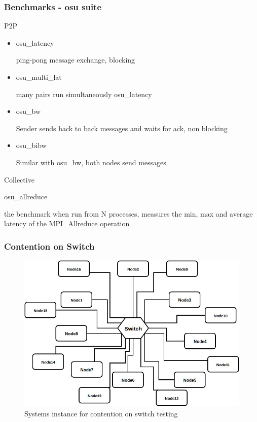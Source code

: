 \documentclass{beamer}
\begin{document}
\begin{frame}
\frametitle{Benchmarks - osu suite}
\begin{block}{P2P}
\begin{itemize}
\item \begin{alertenv}osu\_latency\end{alertenv} {\fontsize{8}{6}\selectfont ping-pong message exchange, blocking}
\item \begin{alertenv}osu\_multi\_lat \end{alertenv}{\fontsize{8}{6}\selectfont many pairs run simultaneously osu\_latency} 
\item \begin{alertenv}osu\_bw \end{alertenv}{\fontsize{8}{6}\selectfont Sender sends back to back messages and waits for ack, non blocking} 
\item \begin{alertenv}osu\_bibw \end{alertenv}{\fontsize{8}{6}\selectfont Similar with osu\_bw, both nodes send messages} 
\end{itemize}
\end{block}


\begin{block}{Collective}
\begin{alertenv}osu\_allreduce\end{alertenv}{\fontsize{8}{6} \selectfont the benchmark when run from N processes, measures the min, max and average latency of the MPI\_Allreduce operation}
\end{block}
\end{frame}
\begin{frame}
\frametitle{Contention on Switch}

\begin{figure}
\includegraphics[width=.8\linewidth,height=\textheight,keepaspectratio]{congestion.jpg}
\caption {Systems instance for contention on switch testing}
\end{figure}

\end{frame}
\end{document}
